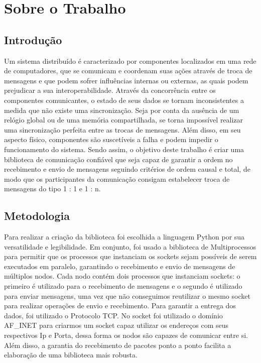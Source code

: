 \documentclass[
	12pt,				%
	openright,			%
	oneside,			%
	a4paper,			%
	english,			%
	french,				%
	spanish,			%
	brazil				%
	]{abntex2}
\begin{document}
\chapter{Sobre o Trabalho}

\section{Introdução}
Um sistema distribuído é caracterizado por componentes localizados em uma rede de computadores,
que se comunicam e coordenam suas ações através de troca de mensagens e que podem sofrer
influências internas ou externas, as quais podem prejudicar a sua interoperabilidade. Através da
concorrência entre os componentes comunicantes, o estado de seus dados se tornam inconsistentes a medida que não existe uma sincronização.
Seja por conta da ausência de um relógio global ou de uma memória compartilhada, se torna impossível realizar uma sincronização perfeita
entre as trocas de mensagens. Além disso, em seu aspecto físico, componentes são suscetíveis a falha
e podem impedir o funcionamento do sistema. Sendo assim, o objetivo deste trabalho é criar uma
biblioteca de comunicação confiável que seja capaz de garantir a ordem no recebimento e envio
de mensagens seguindo critérios de ordem causal e total, de modo que os participantes
da comunicação consigam estabelecer troca de mensagens do tipo 1 : 1 e 1 : n. 

\section{Metodologia}
Para realizar a criação da biblioteca foi escolhida a linguagem Python por sua versatilidade
e legibilidade. Em conjunto, foi usado a biblioteca de Multiprocessos para permitir que os processos
que instanciam os sockets sejam possíveis de serem executados em paralelo,
garantindo o recebimento e envio de mensagens de múltiplos nodos.
Cada nodo contém dois processos que instanciam sockets: o primeiro é utilizado para o recebimento de mensagens
e o segundo é utilizado para enviar mensagens, uma vez que não conseguimos reutilizar o mesmo socket para realizar
operações de envio e recebimento. Para garantir a entrega dos dados, foi utilizado o Protocolo TCP.  
No socket foi utilizado o domínio AF\_INET para criarmos um socket capaz utilizar os endereços com seus respectivos Ip e Porta,
dessa forma os nodos são capazes de comunicar entre si. Além disso,
a garantia do recebimento de pacotes ponto a ponto facilita a elaboração de uma biblioteca
mais robusta.
\end{document}

